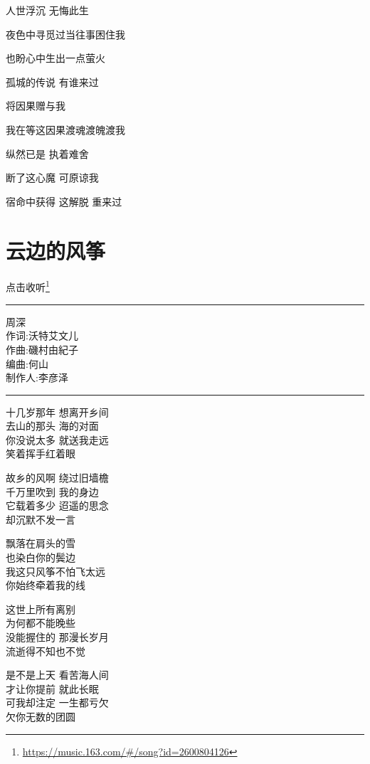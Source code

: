 \documentclass[]{ctexbook}
\renewcommand{\href}[2]{#2\footnote{\url{#1}}}
\begin{document}
人世浮沉 无悔此生

夜色中寻觅过当往事困住我

也盼心中生出一点萤火

孤城的传说 有谁来过

将因果赠与我

我在等这因果渡魂渡魄渡我

纵然已是 执着难舍

断了这心魔 可原谅我

宿命中获得 这解脱 重来过

\section*{云边的风筝}\label{the-kite-by-the-cloud}


\href{https://music.163.com/\#/song?id=2600804126}{点击收听}

\begin{center}\rule{0.5\linewidth}{0.5pt}\end{center}

周深\\
作词:沃特艾文儿\\
作曲:磯村由紀子\\
编曲:何山\\
制作人:李彦泽

\begin{center}\rule{0.5\linewidth}{0.5pt}\end{center}

十几岁那年 想离开乡间\\
去山的那头 海的对面\\
你没说太多 就送我走远\\
笑着挥手红着眼

故乡的风啊 绕过旧墙檐\\
千万里吹到 我的身边\\
它载着多少 迢遥的思念\\
却沉默不发一言

飘落在肩头的雪\\
也染白你的鬓边\\
我这只风筝不怕飞太远\\
你始终牵着我的线

这世上所有离别\\
为何都不能晚些\\
没能握住的 那漫长岁月\\
流逝得不知也不觉

是不是上天 看苦海人间\\
才让你提前 就此长眠\\
可我却注定 一生都亏欠\\
欠你无数的团圆
\end{document}
